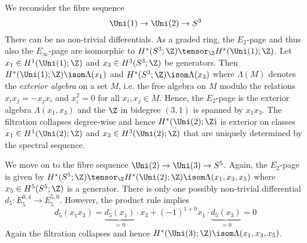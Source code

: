 \begin{example}
	We reconsider the fibre sequence
	\begin{equation*}
		\Uni(1) \to \Uni(2) \to S^3
	\end{equation*}
	There can be no non-trivial differentials.
	As a graded ring, the $E_2$-page and thus also the $E_\infty$-page are isomorphic to $H^*(S^3; \Z) \tensor_{\Z} H^*(\Uni(1); \Z)$.
	Let $x_1 \in H^1(\Uni(1); \Z)$ and $x_3 \in H^3(S^3; \Z)$ be generators.
	Then $H^*(\Uni(1); \Z) \isom \Lambda(x_1)$ and $H^*(S^3; \Z) \isom \Lambda(x_3)$ where $\Lambda(M)$ denotes the \emph{exterior algebra} on a set $M$, i.e. the free algebra on $M$ modulo the relations $x_i x_j = -x_j x_i$ and $x_i^2 = 0$ for all $x_i, x_j \in M$.
	Hence, the $E_2$-page is the exterior algebra $\Lambda(x_1, x_3)$ and the $\Z$ in bidegree $(3, 1)$ is spanned by $x_1 x_3$.
	The filtration collapses degree-wise and hence $H^*(\Uni(2); \Z)$ is exterior on classes $x_1 \in H^1(\Uni(2); \Z)$ and $x_3 \in H^3(\Uni(2); \Z)$ that are uniquely determined by the spectral sequence.
\end{example}
\begin{example}
	We move on to the fibre sequence $\Uni(2) \to \Uni(3) \to S^5$.
	Again, the $E_2$-page is given by $H^*(S^5; \Z) \tensor_{\Z} H^*(\Uni(2); \Z) \isom \Lambda(x_1, x_3, x_5)$ where $x_5 \in H^5(S^5; \Z)$ is a generator.
	There is only one possibly non-trivial differential $d_5\colon E_5^{0, 4} \to E_5^{5, 0}$.
	However, the product rule implies 
	\begin{equation*}
		d_5(x_1 x_3) = \underbrace{d_5(x_1)}_{= 0} \cdot x_3 + (-1)^{1 + 0} x_1 \cdot \underbrace{d_5(x_3)}_{= 0} = 0
	\end{equation*}
	Again the filtration collapses and hence $H^*(\Uni(3); \Z) \isom \Lambda(x_1, x_3, x_5)$.
\end{example}
